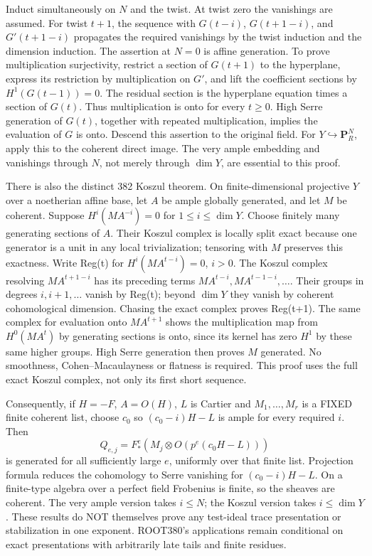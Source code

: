 \documentclass[11pt]{article}
\begin{document}
Induct simultaneously on \(N\) and the twist. At twist zero the vanishings are assumed. For twist \(t+1\), the sequence with \(G(t-i)\), \(G(t+1-i)\), and \(G'(t+1-i)\) propagates the required vanishings by the twist induction and the dimension induction. The assertion at \(N=0\) is affine generation. To prove multiplication surjectivity, restrict a section of \(G(t+1)\) to the hyperplane, express its restriction by multiplication on \(G'\), and lift the coefficient sections by \(H^1(G(t-1))=0\). The residual section is the hyperplane equation times a section of \(G(t)\). Thus multiplication is onto for every \(t\ge0\). High Serre generation of \(G(t)\), together with repeated multiplication, implies the evaluation of \(G\) is onto. Descend this assertion to the original field. For \(Y\hookrightarrow\mathbf P^N_R\), apply this to the coherent direct image. The very ample embedding and vanishings through \(N\), not merely through \(\dim Y\), are essential to this proof.

There is also the distinct 382 Koszul theorem. On finite-dimensional projective \(Y\) over a noetherian affine base, let \(A\) be ample globally generated, and let \(M\) be coherent. Suppose \(H^i(MA^{-i})=0\) for \(1\le i\le\dim Y\). Choose finitely many generating sections of \(A\). Their Koszul complex is locally split exact because one generator is a unit in any local trivialization; tensoring with \(M\) preserves this exactness. Write Reg(t) for \(H^i(MA^{t-i})=0\), \(i>0\). The Koszul complex resolving \(MA^{t+1-i}\) has its preceding terms \(MA^{t-i},MA^{t-1-i},\ldots\). Their groups in degrees \(i,i+1,\ldots\) vanish by Reg(t); beyond \(\dim Y\) they vanish by coherent cohomological dimension. Chasing the exact complex proves Reg(t+1). The same complex for evaluation onto \(MA^{t+1}\) shows the multiplication map from \(H^0(MA^t)\) by generating sections is onto, since its kernel has zero \(H^1\) by these same higher groups. High Serre generation then proves \(M\) generated. No smoothness, Cohen--Macaulayness or flatness is required. This proof uses the full exact Koszul complex, not only its first short sequence.

Consequently, if \(H=-F\), \(A=O(H)\), \(L\) is Cartier and \(M_1,\ldots,M_r\) is a FIXED finite coherent list, choose \(c_0\) so \((c_0-i)H-L\) is ample for every required \(i\). Then
\[
Q_{e,j}=F_*^e(M_j\otimes O(p^e(c_0H-L)))
\]
is generated for all sufficiently large \(e\), uniformly over that finite list. Projection formula reduces the cohomology to Serre vanishing for \((c_0-i)H-L\). On a finite-type algebra over a perfect field Frobenius is finite, so the sheaves are coherent. The very ample version takes \(i\le N\); the Koszul version takes \(i\le\dim Y\). These results do NOT themselves prove any test-ideal trace presentation or stabilization in one exponent. ROOT380's applications remain conditional on exact presentations with arbitrarily late tails and finite residues.
\end{document}
